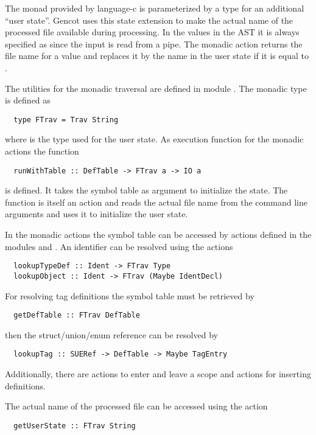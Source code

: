 The monad provided by language-c is parameterized by a type for an additional ``user state''. Gencot uses this
state extension to make the actual name of the processed file available during processing. In the 
values in the AST it is always specified as  since the input is read from a pipe. The monadic
action  returns the file name for a  value and replaces it by the name in the user
state if it is equal to .

The utilities for the monadic traversal are defined in module . The monadic type is
defined as
\begin{verbatim}
  type FTrav = Trav String
\end{verbatim}
where  is the type used for the user state. As execution function for the monadic actions
the function
\begin{verbatim}
  runWithTable :: DefTable -> FTrav a -> IO a
\end{verbatim}
is defined. It takes the symbol table as argument to initialize the state. The function is itself an 
 action and reads the actual file name from the command line arguments and uses it to
initialize the user state.

In the monadic actions the symbol table can be accessed by actions defined in the modules 
 and . An identifier can be
resolved using the actions
\begin{verbatim}
  lookupTypeDef :: Ident -> FTrav Type
  lookupObject :: Ident -> FTrav (Maybe IdentDecl)
\end{verbatim}
For resolving tag definitions the symbol table must be retrieved by
\begin{verbatim}
  getDefTable :: FTrav DefTable
\end{verbatim}
then the struct/union/enum reference can be resolved by
\begin{verbatim}
  lookupTag :: SUERef -> DefTable -> Maybe TagEntry
\end{verbatim}

Additionally, there are actions to enter and leave a scope and actions for inserting definitions.

The actual name of the processed file can be accessed using the action
\begin{verbatim}
  getUserState :: FTrav String
\end{verbatim}
